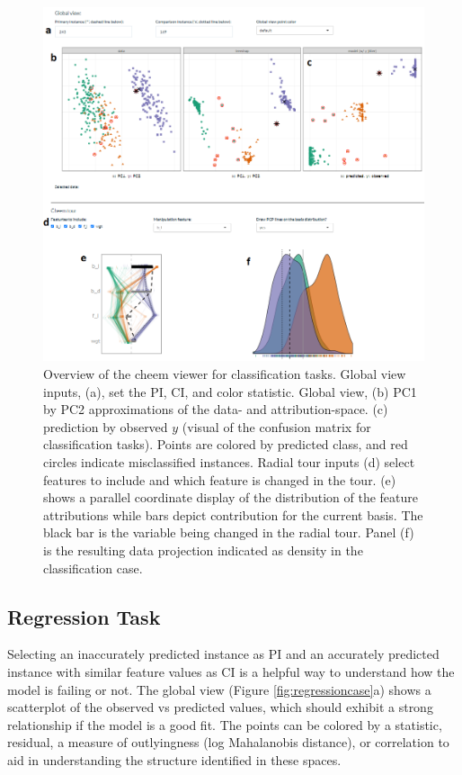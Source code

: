 \documentclass[11pt,twoside]{article}
\begin{document}
\begin{figure}

{\centering \includegraphics[width=1\linewidth]{./figures/app_classification} 

}

\caption{Overview of the cheem viewer for classification tasks. Global view inputs, (a), set the PI, CI, and color statistic. Global view, (b) PC1 by PC2 approximations of the data- and attribution-space. (c) prediction by observed $y$ (visual of the confusion matrix for classification tasks). Points are colored by predicted class, and red circles indicate misclassified instances. Radial tour inputs (d) select features to include and which feature is changed in the tour. (e) shows a parallel coordinate display of the distribution of the feature attributions while bars depict contribution for the current basis. The black bar is the variable being changed in the radial tour. Panel (f) is the resulting data projection indicated as density in the classification case.}\label{fig:classificationcase}
\end{figure}

\hypertarget{regression-task}{%
\subsection{Regression Task}\label{regression-task}}

Selecting an inaccurately predicted instance as PI and an accurately predicted instance with similar feature values as CI is a helpful way to understand how the model is failing or not. The global view (Figure \ref{fig:regressioncase}a) shows a scatterplot of the observed vs predicted values, which should exhibit a strong relationship if the model is a good fit. The points can be colored by a statistic, residual, a measure of outlyingness (log Mahalanobis distance), or correlation to aid in understanding the structure identified in these spaces.
\end{document}
